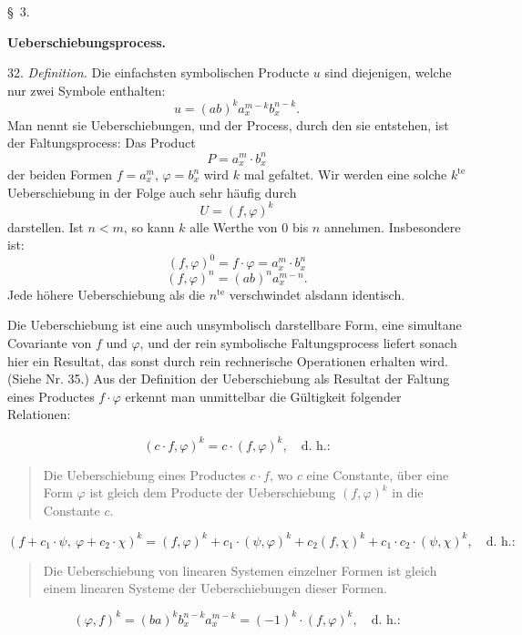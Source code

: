 \documentclass[11pt]{article}
\providecommand{\weberpage}[1]{}
\providecommand{\weq}[2]{\begin{equation}\tag{#1}#2\end{equation}}
\begin{document}
\weberpage{33}

\begin{center}
\S~3.

\textbf{Ueberschiebungsprocess.}
\end{center}

32. \textit{Definition.} Die einfachsten symbolischen Producte $u$ sind
diejenigen, welche nur zwei Symbole enthalten:
\[
u = (ab)^k a_x^{m-k} b_x^{n-k}.
\]
Man nennt sie \glqq Ueberschiebungen\grqq{}, und der Process, durch den sie
entstehen, ist der Faltungsprocess: Das Product
\[
P = a_x^m \cdot b_x^n
\]
der beiden Formen $f = a_x^m$, $\varphi = b_x^n$ wird $k$ mal gefaltet. Wir
werden eine solche $k^{\text{te}}$ Ueberschiebung in der Folge auch sehr
häufig durch
\[
U = (f, \varphi)^k
\]
darstellen. Ist $n < m$, so kann $k$ alle Werthe von 0 bis $n$ annehmen.
Insbesondere ist:
\[
(f, \varphi)^0 = f \cdot \varphi = a_x^m \cdot b_x^n
\]
\[
(f, \varphi)^n = (ab)^n a_x^{m-n}.
\]
Jede höhere Ueberschiebung als die $n^{\text{te}}$ verschwindet alsdann
identisch.

Die Ueberschiebung ist eine auch unsymbolisch darstellbare Form, eine
simultane Covariante von $f$ und $\varphi$, und der rein symbolische
Faltungsprocess liefert sonach hier ein Resultat, das sonst durch rein
rechnerische Operationen erhalten wird. (Siehe Nr. 35.) Aus der Definition
der Ueberschiebung als Resultat der Faltung eines Productes $f \cdot \varphi$
erkennt man unmittelbar die Gültigkeit folgender Relationen:

\weq{$\alpha$}{(c \cdot f, \varphi)^k = c \cdot (f, \varphi)^k, \quad \text{d. h.:}}

\begin{quote}
\glqq Die Ueberschiebung eines Productes $c \cdot f$, wo $c$ eine
Constante, über eine Form $\varphi$ ist gleich dem Producte der
Ueberschiebung $(f, \varphi)^k$ in die Constante $c$.\grqq{}
\end{quote}

\weq{$\beta$}{(f + c_1 \cdot \psi,\ \varphi + c_2 \cdot \chi)^k = (f, \varphi)^k + c_1 \cdot (\psi, \varphi)^k + c_2 (f, \chi)^k + c_1 \cdot c_2 \cdot (\psi, \chi)^k, \quad \text{d. h.:}}

\begin{quote}
\glqq Die Ueberschiebung von linearen Systemen einzelner Formen ist gleich
einem linearen Systeme der Ueberschiebungen dieser Formen.\grqq{}
\end{quote}

\weq{$\gamma$}{(\varphi, f)^k = (ba)^k b_x^{n-k} a_x^{m-k} = (-1)^k \cdot (f, \varphi)^k, \quad \text{d. h.:}}
\end{document}
